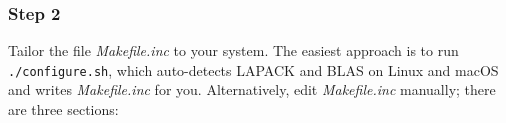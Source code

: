 \documentclass[12pt]{article}
\newcommand{\arpack}{{\sc arpack}}
\newcommand{\arpacks}{{\sc arpack }}
\newcommand{\metis}{{\sc metis}}
\newcommand{\metiss}{{\sc metis }}
\begin{document}

\subsubsection*{Step 2}

Tailor the file {\sl Makefile.inc\/} to your system. The easiest
approach is to run {\tt ./configure.sh}, which auto-detects LAPACK and
BLAS on Linux and macOS and writes {\sl Makefile.inc\/} for you.
Alternatively, edit {\sl Makefile.inc\/} manually; there are three
sections:
\end{document}
